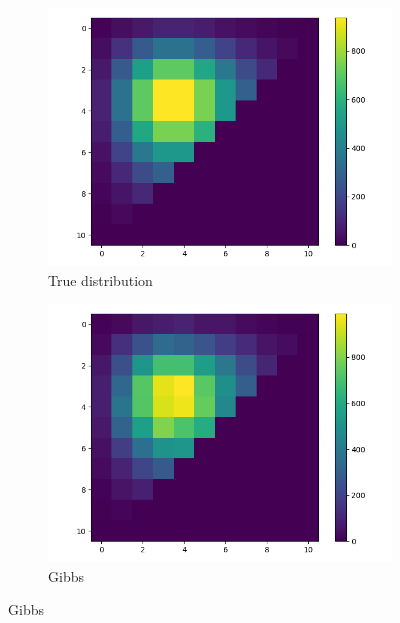 \begin{figure}[H]
        \centering
        \begin{subfigure}[H]{0.475\textwidth}
            \centering
            \includegraphics[width=\textwidth]{figures/true.png}
            \caption[Network2]%
            {{\small True distribution}}    
            \label{fig:mean and std of net14}
        \end{subfigure}
        \hfill
        \begin{subfigure}[H]{0.475\textwidth}  
            \centering 
            \includegraphics[width=\textwidth]{figures/direct.png}
            \caption[]%
            {{\small Gibbs}}    
            \label{fig:mean and std of net24}
        \end{subfigure}

\end{figure}

